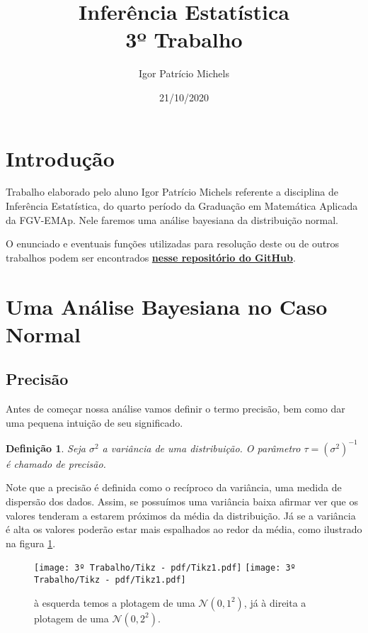 \documentclass{article}
\title{Inferência Estatística \\ 3º Trabalho}
\author{Igor Patrício Michels}
\date{21/10/2020}
\newtheorem{definition}{Definição}
\begin{document}
\maketitle

\section*{Introdução}

Trabalho elaborado pelo aluno Igor Patrício Michels referente a disciplina de Inferência Estatística, do quarto período da Graduação em Matemática Aplicada da FGV-EMAp. Nele faremos uma análise bayesiana da distribuição normal.

O enunciado e eventuais funções utilizadas para resolução deste ou de outros trabalhos podem ser encontrados \href{https://github.com/IgorMichels/Statistical_Inference}{\textbf{nesse repositório do GitHub}}.

\section*{Uma Análise Bayesiana no Caso Normal}

\subsection*{Precisão}

Antes de começar nossa análise vamos definir o termo precisão, bem como dar uma pequena intuição de seu significado.

\begin{definition}
    Seja $\sigma^2$ a variância de uma distribuição. O parâmetro $\tau = \left(\sigma^2\right)^{-1}$ é chamado de precisão.
\end{definition}

Note que a precisão é definida como o recíproco da variância, uma medida de dispersão dos dados. Assim, se possuímos uma variância baixa afirmar ver que os valores tenderam a estarem próximos da média da distribuição. Já se a variância é alta os valores poderão estar mais espalhados ao redor da média, como ilustrado na figura \ref{gaussianas}.
\begin{figure}[H]
    \texttt{[image: 3º Trabalho/Tikz - pdf/Tikz1.pdf]}
    \texttt{[image: 3º Trabalho/Tikz - pdf/Tikz1.pdf]}
    \caption{à esquerda temos a plotagem de uma $\mathcal{N}(0, 1^2)$, já à direita a plotagem de uma $\mathcal{N}(0, 2^2)$.}
    \label{gaussianas}
\end{figure}
\end{document}
